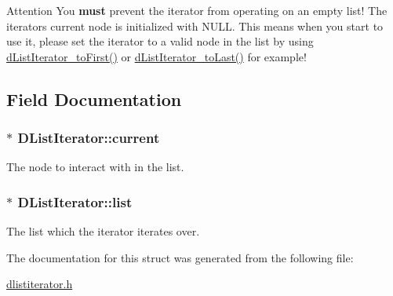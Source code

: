 \begin{DoxyAttention}{Attention}
You {\bfseries must} prevent the iterator from operating on an empty list! The iterator\textquotesingle{}s current node is initialized with N\+U\+LL. This means when you start to use it, please set the iterator to a valid node in the list by using \textquotesingle{}\hyperlink{dlistiterator_8h_afde985be14b96579309b54eed487edd6}{d\+List\+Iterator\+\_\+to\+First()}\textquotesingle{} or \textquotesingle{}\hyperlink{dlistiterator_8h_aa5fb3cc3e82ba75af115999bccd88460}{d\+List\+Iterator\+\_\+to\+Last()}\textquotesingle{} for example! 
\end{DoxyAttention}


\subsection{Field Documentation}
\subsubsection[{\texorpdfstring{current}{current}}]{$\ast$ D\+List\+Iterator\+::current}\hypertarget{structDListIterator_a5f347829fbf97fb211160150628db997}{}\label{structDListIterator_a5f347829fbf97fb211160150628db997}
The node to interact with in the list. 
\subsubsection[{\texorpdfstring{list}{list}}]{$\ast$ D\+List\+Iterator\+::list}\hypertarget{structDListIterator_ad948282c06cc2a1c796699443404c73f}{}\label{structDListIterator_ad948282c06cc2a1c796699443404c73f}
The list which the iterator iterates over. 

The documentation for this struct was generated from the following file\+:\begin{DoxyCompactItemize}
\item 
\hyperlink{dlistiterator_8h}{dlistiterator.\+h}\end{DoxyCompactItemize}
